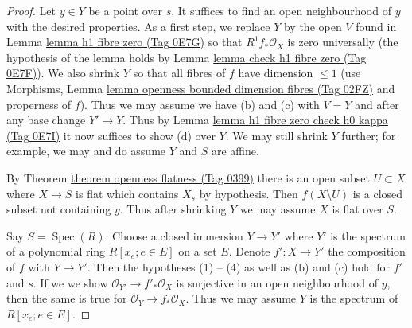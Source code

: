 \documentclass{amsart}
\theoremstyle{plain}
\theoremstyle{definition}
\theoremstyle{remark}
\numberwithin{equation}{subsection}
\def\Spec{\mathop{\mathrm{Spec}}}
\begin{document}
\begin{proof}
Let $y \in Y$ be a point over $s$.
It suffices to find an open neighbourhood of $y$
with the desired properties. As a first step, we replace $Y$
by the open $V$ found in Lemma \href{https://stacks.math.columbia.edu/tag/0E7G}{lemma h1 fibre zero (Tag 0E7G)} so that
$R^1f_*\mathcal{O}_X$ is zero universally (the hypothesis of
the lemma holds by Lemma \href{https://stacks.math.columbia.edu/tag/0E7F}{lemma check h1 fibre zero (Tag 0E7F)}).
We also shrink $Y$ so that all fibres of $f$ have dimension $\leq 1$
(use Morphisms, Lemma
\href{https://stacks.math.columbia.edu/tag/02FZ}{lemma openness bounded dimension fibres (Tag 02FZ)}
and properness of $f$). Thus we may assume we have (b) and (c)
with $V = Y$ and after any base change $Y' \to Y$.
Thus by Lemma \href{https://stacks.math.columbia.edu/tag/0E7I}{lemma h1 fibre zero check h0 kappa (Tag 0E7I)}
it now suffices to show (d) over $Y$.
We may still shrink $Y$ further; for example, we may and do
assume $Y$ and $S$ are affine.

\medskip\noindent
By Theorem \href{https://stacks.math.columbia.edu/tag/0399}{theorem openness flatness (Tag 0399)}
there is an open subset $U \subset X$ where $X \to S$
is flat which contains $X_s$ by hypothesis.
Then $f(X \setminus U)$ is a closed subset
not containing $y$. Thus after shrinking $Y$
we may assume $X$ is flat over $S$.

\medskip\noindent
Say $S = \Spec(R)$. Choose a closed immersion $Y \to Y'$ where $Y'$
is the spectrum of a polynomial ring $R[x_e; e \in E]$ on a set $E$.
Denote $f' : X \to Y'$ the composition of $f$ with $Y \to Y'$.
Then the hypotheses (1) -- (4) as well as (b) and (c)
hold for $f'$ and $s$. If we we show $\mathcal{O}_{Y'} \to f'_*\mathcal{O}_X$
is surjective in an open neighbourhood of $y$, then the same is true for
$\mathcal{O}_Y \to f_*\mathcal{O}_X$. Thus we may assume $Y$ is
the spectrum of $R[x_e; e \in E]$.


\end{proof}
\end{document}
